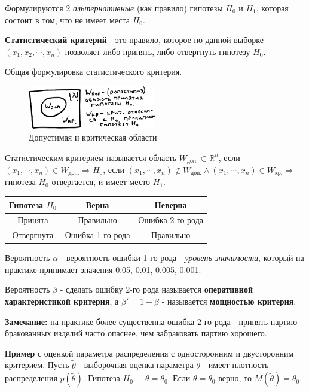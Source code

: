\documentclass[12pt, a4paper]{article}
\newcommand{\dop}{\textrm{доп.}}
\newcommand{\kr}{\textrm{кр.}}
\begin{document}
Формулируются 2 \textit{альтернативные} (как правило) гипотезы $H_0$ и $H_1$, которая состоит в том, что не имеет места $H_0$.

\textbf{Статистический критерий} - это правило, которое по данной выборке $(x_1, x_2, \cdots, x_n)$ позволяет либо принять, либо отвергнуть гипотезу $H_0$.

Общая формулировка статистического критерия.
\begin{figure}[h]
 \centering
 \includegraphics[width=0.5\textwidth]{06}
 \vspace{-4mm}
  \caption{Допустимая и критическая области}
\end{figure}

Статистическим критерием называется область $W_{\dop} \subset \mathbb{R}^n$, если $(x_1, \cdots, x_n) \in W_{\dop} \Rightarrow H_0$, если $(x_1, \cdots, x_n) \notin W_{\dop} \land (x_1, \cdots, x_n) \in W_{\kr} \Rightarrow$ гипотеза $H_0$ отвергается, и имеет место $H_1$.

\begin{center}
\begin{tabular}{|c|c|c|}
\hline
Гипотеза $H_0$ & Верна & Неверна \\
\hline
Принята & Правильно & Ошибка 2-го рода \\
Отвергнута & Ошибка 1-го рода & Правильно \\
\hline
\end{tabular}
\end{center}

Вероятность $\alpha$ - вероятность ошибки 1-го рода - \textit{уровень значимости}, который на практике принимает значения 0.05, 0.01, 0.005, 0.001.

Вероятность $\beta$ - сделать ошибку 2-го рода называется \textbf{оперативной характеристикой критерия}, а $\beta' = 1-\beta$ - называется \textbf{мощностью критерия}.

\textbf{Замечание:} на практике более существенна ошибка 2-го рода - принять партию бракованных изделий часто опаснее, чем забраковать партию хорошего.

\textbf{Пример} с оценкой параметра распределения с односторонним и двусторонним критерием. Пусть $\tilde{\theta}$ - выборочная оценка параметра $\theta$ - имеет плотность распределения $p(\tilde{\theta})$. Гипотеза $H_0: \quad \theta = \theta_0$. Если $\theta = \theta_0$ верно, то $M(\tilde{\theta}) = \theta_0$.
\end{document}
